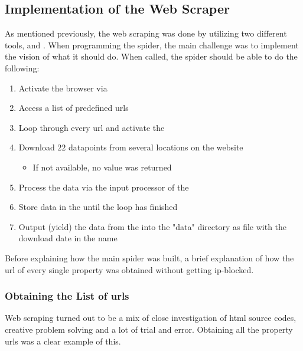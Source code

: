 \documentclass[main]{subfiles}
\begin{document}
\subsection{Implementation of the Web Scraper}
\label{implementationscraper}
As mentioned previously, the web scraping was done by utilizing two different tools, \pkg[Scrapy] and \pkg[Selenium].
When programming the spider, the main challenge was to implement the vision of what it should do. 
When called, the spider should be able to do the following:
\begin{enumerate}
    \item Activate the browser via \hspace*{-6pt} \pkg[Selenium]
    \item Access a list of predefined \acsp*{url}
    \item Loop through every \acs*{url} and activate the \js
    \item Download $22$ datapoints from several locations on the website
    \begin{itemize}
        \item If not available, no value was returned
    \end{itemize}
    \item Process the data via the input processor of the \hspace*{-6pt}\pkg[ItemLoader]
    \item Store data in the \hspace*{-6pt} \pkg[ItemLoader] until the loop has finished
    \item Output (yield) the data from the \hspace*{-5pt} \pkg[ItemLoader] into the "data" directory as \hspace*{-5pt}
    \pkg[.csv] file with the download date in the name
\end{enumerate}

Before explaining how the main spider was built,
a brief explanation of how the \acs*{url} of every single property was obtained without getting \acs*{ip}-blocked.

\vspace*{5pt}
\subsubsection{Obtaining the List of \acsp*{url}}
\label{scrape1}
Web scraping turned out to be a mix of close investigation of \acs*{html} source codes, 
creative problem solving and a lot of trial and error. 
Obtaining all the property \acsp*{url} was a clear example of this.
\end{document}
